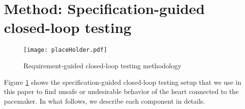 \section{Method: Specification-guided closed-loop testing}
\label{method}

\begin{figure}[!t]
	\centering
	\texttt{[image: placeHolder.pdf]}
	\caption{\small Requirement-guided closed-loop testing methodology}
	\label{fig:reqGuidedTesting}
\end{figure} 

Figure \ref{fig:reqGuidedTesting} shows the specification-guided closed-loop testing setup that we use in this paper to find unsafe or undesirable behavior of the heart connected to the pacemaker.
In what follows, we describe each component in details.






